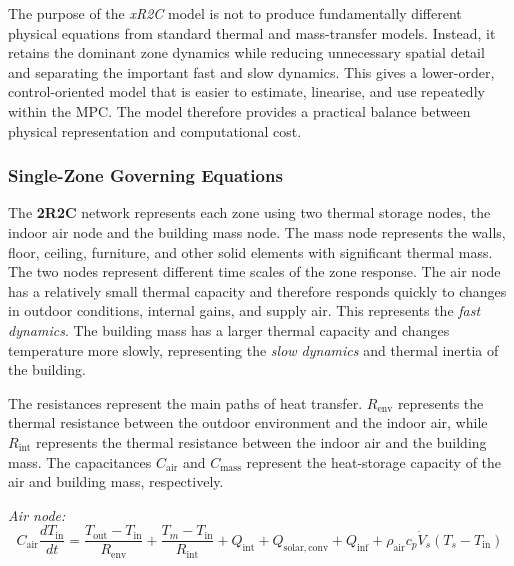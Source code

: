 \documentclass[12pt, a4paper]{article}
\begin{document}
	The purpose of the \textit{xR2C} model is not to produce fundamentally
	different physical equations from standard thermal and mass-transfer models.
	Instead, it retains the dominant zone dynamics while reducing unnecessary
	spatial detail and separating the important fast and slow dynamics. This gives
	a lower-order, control-oriented model that is easier to estimate, linearise,
	and use repeatedly within the MPC. The model therefore provides a practical
	balance between physical representation and computational cost.
	
	

	\subsubsection{Single-Zone Governing Equations}

	
	The \textbf{2R2C} network represents each zone using two thermal storage
	nodes, the indoor air node and the building mass node. The mass node represents
	the walls, floor, ceiling, furniture, and other solid elements with significant
	thermal mass. The two nodes represent different time scales of the zone response. The air
	node has a relatively small thermal capacity and therefore responds quickly to
	changes in outdoor conditions, internal gains, and supply air. This represents
	the \textit{fast dynamics}. The building mass has a larger thermal capacity and
	changes temperature more slowly, representing the \textit{slow dynamics} and
	thermal inertia of the building.
	
	The resistances represent the main paths of heat transfer. $R_{\mathrm{env}}$
	represents the thermal resistance between the outdoor environment and the
	indoor air, while $R_{\mathrm{int}}$ represents the thermal resistance between
	the indoor air and the building mass. The capacitances
	$C_{\mathrm{air}}$ and $C_{\mathrm{mass}}$ represent the heat-storage
	capacity of the air and building mass, respectively.
	
	
	\noindent \textit{Air node:}
	\begin{equation}
		C_{\mathrm{air}} \frac{dT_{\mathrm{in}}}{dt}
		=
		\frac{T_{\mathrm{out}} - T_{\mathrm{in}}}{R_{\mathrm{env}}}
		+
		\frac{T_m - T_{\mathrm{in}}}{R_{\mathrm{int}}}
		+
		Q_{\mathrm{int}}
		+
		Q_{\mathrm{solar,conv}}
		+
		Q_{\mathrm{inf}}
		+
		\rho_{\mathrm{air}} c_p \dot{V}_s
		\left(T_s - T_{\mathrm{in}}\right)
		\label{eq:air_node_single}
	\end{equation}
	
\end{document}
